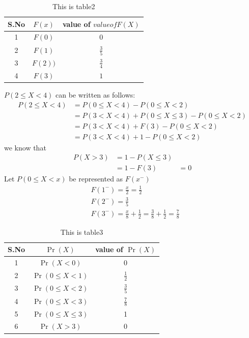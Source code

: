 \documentclass[journal,12pt,twocolumn]{IEEEtran}
\begin{document}
\begin{table}[h!]
\resizebox{9.5cm}{!}
{ 
\begin{tabular}{|c|c|c|}
\hline
S.No & $F(x)$  & value of $value of F(X)$\\
\hline
1 & $F(0)$ & $0$ \\
\hline
2 & $F(1)$ & $\frac{3}{5}$ \\
\hline
3 &  $F(2))$ & $\frac{3}{4}$ \\
\hline
4 & $F(3)$ & $1$ \\
\hline
\end{tabular} 
}
\caption{This is table2}
\label{table:2}
\end{table}

$P(2 \leq X <4) $ can be written as follows:
\begin{align}
P(2 \leq X <4) &= P(0 \leq X < 4) - P(0 \leq X <2)\\
&= P(3<X<4) + P(0 \leq X \leq 3)  - P(0 \leq X <2) \\
&=  P(3<X<4) + F(3)  - P(0 \leq X <2) \\
&=  P(3<X<4) + 1  - P(0 \leq X <2) \label{2}
\end{align}
we know that 
\begin{align}
P(X>3)&=1-P(X \leq 3)\\
&=1-F(3)
&=0 \label{3}
\end{align}
Let $P(0 \leq X <x)$ be represented as $F(x^-)$
\begin{align}
& F(1^-) = \frac{x}{2} = \frac{1}{2} \\
& F(2^-) = \frac{3}{5} \label{4} \\
& F(3^-) = \frac{x}{8} + \frac{1}{2} = \frac{3}{8}+ \frac{1}{2} = 
\frac{7}{8}
\end{align}

\begin{table}[h!]
\resizebox{9.5cm}{!}
{ 
\begin{tabular}{|c|c|c|}
\hline
S.No & $\Pr(X)$  & value of $\Pr(X)$\\
\hline
1 & $\Pr(X<0)$ & 0 \\
\hline
2 & $\Pr(0 \leq X<1)$ & $\frac{1}{2}$ \\
\hline
3 & $\Pr(0 \leq X<2 )$ & $\frac{3}{5}$ \\
\hline
4 &  $\Pr(0 \leq X< 3)$ & $\frac{7}{8}$ \\
\hline
5 & $\Pr(0 \leq X \leq 3)$ & 1 \\
\hline
6 & $\Pr(X>3)$ & 0 \\
\hline
\end{tabular} 
}
\caption{This is table3}
\label{table:3}
\end{table}
\end{document}
